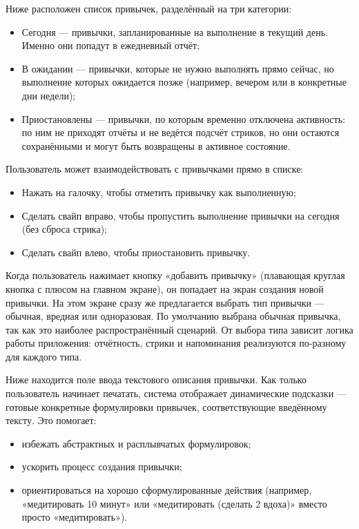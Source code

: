 \documentclass[pdflatex,sn-mathphys-num]{sn-jnl}%
\theoremstyle{thmstyleone}%
\theoremstyle{thmstyletwo}%
\theoremstyle{thmstylethree}%
\begin{document}
Ниже расположен список привычек, разделённый на три категории:

\begin{itemize}
    \item Сегодня — привычки, запланированные на выполнение в текущий день. Именно они попадут в ежедневный отчёт;
    \item В ожидании — привычки, которые не нужно выполнять прямо сейчас, но выполнение которых ожидается позже (например, вечером или в конкретные дни недели);
    \item Приостановлены — привычки, по которым временно отключена активность: по ним не приходят отчёты и не ведётся подсчёт стриков, но они остаются сохранёнными и могут быть возвращены в активное состояние.
\end{itemize}

Пользователь может взаимодействовать с привычками прямо в списке:

\begin{itemize}
    \item Нажать на галочку, чтобы отметить привычку как выполненную;
    \item Сделать свайп вправо, чтобы пропустить выполнение привычки на сегодня (без сброса стрика);
    \item Сделать свайп влево, чтобы приостановить привычку.
\end{itemize}

Когда пользователь нажимает кнопку «добавить привычку» (плавающая круглая кнопка с плюсом на главном экране), он попадает на экран создания новой привычки. На этом экране сразу же предлагается выбрать тип привычки — обычная, вредная или одноразовая. По умолчанию выбрана обычная привычка, так как это наиболее распространённый сценарий. От выбора типа зависит логика работы приложения: отчётность, стрики и напоминания реализуются по-разному для каждого типа.

Ниже находится поле ввода текстового описания привычки. Как только пользователь начинает печатать, система отображает динамические подсказки — готовые конкретные формулировки привычек, соответствующие введённому тексту. Это помогает:

\begin{itemize}
    \item избежать абстрактных и расплывчатых формулировок;
    \item ускорить процесс создания привычки;
    \item ориентироваться на хорошо сформулированные действия (например, «медитировать 10 минут» или «медитировать (сделать 2 вдоха)» вместо просто «медитировать»).
\end{itemize}
\end{document}
